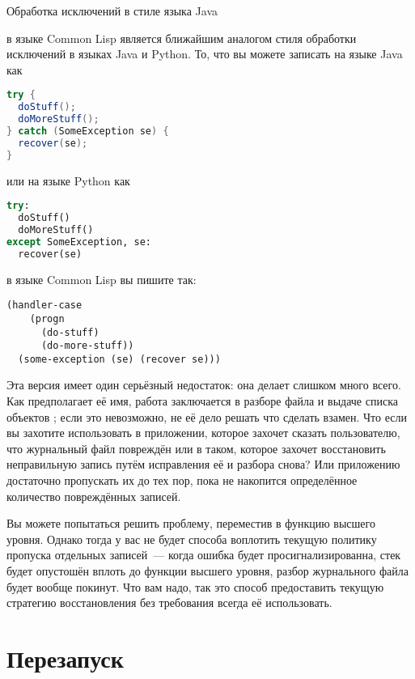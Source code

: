  Обработка исключений в стиле языка Java 

 в языке Common Lisp является ближайшим аналогом стиля обработки
исключений в языках Java и Python. То, что вы можете записать на языке Java как 

\begin{lstlisting}[language=Java]
try {
  doStuff();
  doMoreStuff();
} catch (SomeException se) {
  recover(se);
}
\end{lstlisting} 

\noindent{}или на языке Python как 

\begin{lstlisting}[language=Python]
try:
  doStuff()
  doMoreStuff()
except SomeException, se:
  recover(se)
\end{lstlisting} 

в языке Common Lisp вы пишите так: 

\begin{lstlisting}
(handler-case
    (progn
      (do-stuff)
      (do-more-stuff))
  (some-exception (se) (recover se)))
\end{lstlisting} 


Эта версия  имеет один серьёзный недостаток: она делает слишком много
всего. Как предполагает её имя, работа  заключается в разборе файла и
выдаче списка объектов ; если это невозможно, не её дело решать что
сделать взамен. Что если вы захотите использовать  в приложении,
которое захочет сказать пользователю, что журнальный файл повреждён или в таком, которое
захочет восстановить неправильную запись путём исправления её и разбора снова? Или
приложению достаточно пропускать их до тех пор, пока не накопится определённое количество
повреждённых записей.

Вы можете попытаться решить проблему, переместив  в функцию высшего
уровня. Однако тогда у вас не будет способа воплотить текущую политику пропуска отдельных
записей~--- когда ошибка будет просигнализированна, стек будет опустошён вплоть до функции
высшего уровня, разбор журнального файла будет вообще покинут. Что вам надо, так это
способ предоставить текущую стратегию восстановления без требования всегда её
использовать.

\section{Перезапуск}

